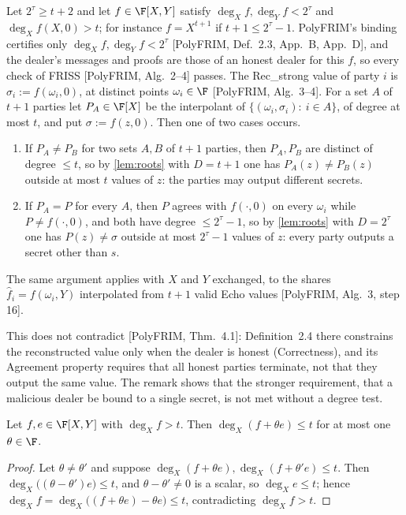 {{\begin{remark}\label{rem:avss-threshold}\notready{}
Let $2^\tau\ge t+2$ and let $f\in\F[X,Y]$ satisfy $\deg_Xf,\deg_Yf<2^\tau$ and
$\deg_Xf(X,0)>t$; for instance $f=X^{t+1}$ if $t+1\le2^\tau-1$. PolyFRIM's binding certifies
only $\deg_Xf,\deg_Yf<2^\tau$ {[PolyFRIM, Def.~2.3, App.~B, App.~D]}, and the dealer's messages
and proofs are those of an honest dealer for this $f$, so every check of FRISS
{[PolyFRIM, Alg.~2--4]} passes. The Rec\_strong value of party $i$ is $\sigma_i:=f(\omega_i,0)$, at
distinct points $\omega_i\in\F$ {[PolyFRIM, Alg.~3--4]}. For a set $A$ of $t+1$ parties let
$P_A\in\F[X]$ be the interpolant of $\{(\omega_i,\sigma_i):\ i\in A\}$, of degree at most $t$, and put
$\sigma:=f(z,0)$. Then one of two cases occurs.
\begin{enumerate}
\item If $P_A\ne P_B$ for two sets $A,B$ of $t+1$ parties, then $P_A,P_B$ are distinct of
degree $\le t$, so by \ref{lem:roots} with $D=t+1$ one has $P_A(z)\ne P_B(z)$ outside at most $t$
values of $z$: the parties may output different secrets.
\item If $P_A=P$ for every $A$, then $P$ agrees with $f(\cdot,0)$ on every $\omega_i$ while
$P\ne f(\cdot,0)$, and both have degree $\le2^\tau-1$, so by \ref{lem:roots} with $D=2^\tau$ one has
$P(z)\ne\sigma$ outside at most $2^\tau-1$ values of $z$: every party outputs a secret other than
$s$.
\end{enumerate}
The same argument applies with $X$ and $Y$ exchanged, to the shares $\hat f_i=f(\omega_i,Y)$
interpolated from $t+1$ valid Echo values {[PolyFRIM, Alg.~3, step 16]}.

This does not contradict {[PolyFRIM, Thm.~4.1]}: Definition~2.4 there constrains the
reconstructed value only when the dealer is honest (Correctness), and its Agreement property
requires that all honest parties terminate, not that they output the same value. The remark
shows that the stronger requirement, that a malicious dealer be bound to a single secret, is not
met without a degree test.
\end{remark}


\begin{lemma}\label{lem:avss-bad}
Let $f,e\in\F[X,Y]$ with $\deg_Xf>t$. Then $\deg_X(f+\theta e)\le t$ for at most one
$\theta\in\F$.
\end{lemma}

\begin{proof}
Let $\theta\ne\theta'$ and suppose $\deg_X(f+\theta e),\deg_X(f+\theta'e)\le t$. Then
$\deg_X\big((\theta-\theta')e\big)\le t$, and $\theta-\theta'\ne0$ is a scalar, so $\deg_Xe\le t$;
hence $\deg_Xf=\deg_X\big((f+\theta e)-\theta e\big)\le t$, contradicting $\deg_Xf>t$.
\end{proof}

}}
